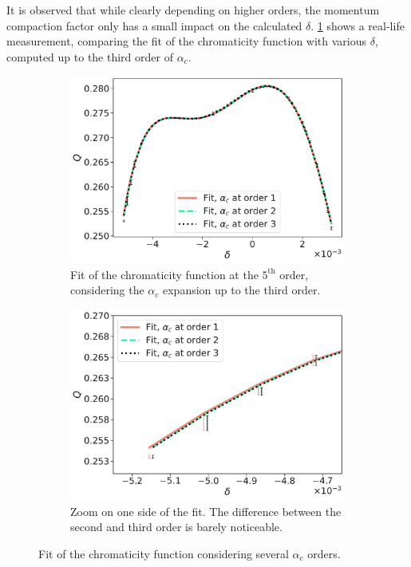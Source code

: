 It is observed that while clearly depending on higher orders, the momentum compaction factor only
has a small impact on the calculated $\delta$.
\cref{fig:decapoles:chromaticity:momentum_compaction_factor_chroma_meas} shows a real-life 
measurement, comparing the fit of the chromaticity function with various $\delta$, computed up to
the third order of $\alpha_c$.

\begin{figure}[tbh]
    \centering
    \begin{subfigure}[t]{0.48\textwidth}
        \centering
        \includegraphics[width=\textwidth]{images/chroma_function_alpha_c.pdf}
        \caption{Fit of the chromaticity function at the $5^{\text{th}}$ order, considering the
        $\alpha_c$ expansion up to the third order.}
    \end{subfigure}
    \hfill
    \begin{subfigure}[t]{0.48\textwidth}
        \centering
        \includegraphics[width=\textwidth]{images/chroma_function_alpha_c_zoom.pdf}
        \caption{Zoom on one side of the fit. The difference between the second and third order
        is barely noticeable.}
    \end{subfigure}
    \caption{Fit of the chromaticity function considering several $\alpha_c$ orders.}
    \label{fig:decapoles:chromaticity:momentum_compaction_factor_chroma_meas}
\end{figure}

